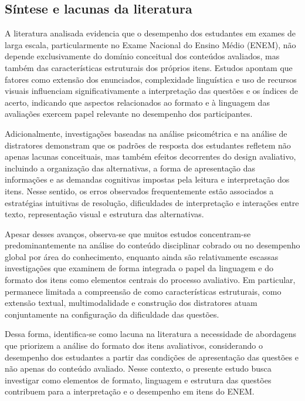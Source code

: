 \documentclass[a4paper,10pt, twocolumn]{article}
\begin{document}
\subsection{Síntese e lacunas da literatura}

A literatura analisada evidencia que o desempenho dos estudantes em exames de larga escala, particularmente no Exame Nacional do Ensino Médio (ENEM), não depende exclusivamente do domínio conceitual dos conteúdos avaliados, mas também das características estruturais dos próprios itens. Estudos apontam que fatores como extensão dos enunciados, complexidade linguística e uso de recursos visuais influenciam significativamente a interpretação das questões e os índices de acerto, indicando que aspectos relacionados ao formato e à linguagem das avaliações exercem papel relevante no desempenho dos participantes.

Adicionalmente, investigações baseadas na análise psicométrica e na análise de distratores demonstram que os padrões de resposta dos estudantes refletem não apenas lacunas conceituais, mas também efeitos decorrentes do design avaliativo, incluindo a organização das alternativas, a forma de apresentação das informações e as demandas cognitivas impostas pela leitura e interpretação dos itens. Nesse sentido, os erros observados frequentemente estão associados a estratégias intuitivas de resolução, dificuldades de interpretação e interações entre texto, representação visual e estrutura das alternativas.

Apesar desses avanços, observa-se que muitos estudos concentram-se predominantemente na análise do conteúdo disciplinar cobrado ou no desempenho global por área do conhecimento, enquanto ainda são relativamente escassas investigações que examinem de forma integrada o papel da linguagem e do formato dos itens como elementos centrais do processo avaliativo. Em particular, permanece limitada a compreensão de como características estruturais, como extensão textual, multimodalidade e construção dos distratores atuam conjuntamente na configuração da dificuldade das questões.

Dessa forma, identifica-se como lacuna na literatura a necessidade de abordagens que priorizem a análise do formato dos itens avaliativos, considerando o desempenho dos estudantes a partir das condições de apresentação das questões e não apenas do conteúdo avaliado. Nesse contexto, o presente estudo busca investigar como elementos de formato, linguagem e estrutura das questões contribuem para a interpretação e o desempenho em itens do ENEM.
\end{document}
